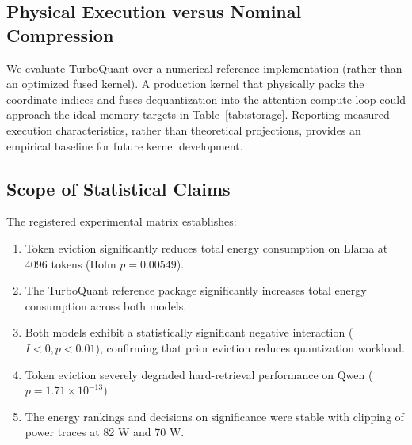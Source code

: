 \documentclass[sigconf,nonacm]{acmart}
\begin{document}
\subsection{Physical Execution versus Nominal Compression}

We evaluate TurboQuant over a numerical reference implementation (rather than an optimized fused kernel). A production kernel that physically packs the coordinate indices and fuses dequantization into the attention compute loop could approach the ideal memory targets in Table~\ref{tab:storage}. Reporting measured execution characteristics, rather than theoretical projections, provides an empirical baseline for future kernel development.
\subsection{Scope of Statistical Claims}

The registered experimental matrix establishes:
\begin{enumerate}
  \item Token eviction significantly reduces total energy consumption on Llama at 4096 tokens (Holm $p = 0.00549$).
  \item The TurboQuant reference package significantly increases total energy consumption across both models.
  \item Both models exhibit a statistically significant negative interaction ($I < 0, p < 0.01$), confirming that prior eviction reduces quantization workload.
  \item Token eviction severely degraded hard-retrieval performance on Qwen ($p = 1.71 \times 10^{-13}$).
  \item The energy rankings and decisions on significance were stable with clipping of power traces at 82 W and 70 W.
\end{enumerate}
\end{document}
